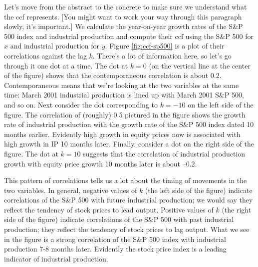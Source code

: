 \documentclass[letterpaper,12pt]{article}
\begin{document}
Let's move from the abstract to the concrete to make sure we 
understand what the ccf represents.
[You might want to work your way through this paragraph slowly, 
it's important.]  
We calculate the year-on-year growth rates of the S\&P 500 index 
and industrial production and compute their ccf using 
the S\&P 500 for $x$ and industrial production for $y$.
Figure \ref{fig:ccf-sp500} is a plot of their correlations against 
the lag $k$.
There's a lot of information here, so let's go through it 
one dot at a time.
The dot at $k=0$ (on the vertical line at the center of the figure) 
shows that the contemporaneous correlation is about 0.2.
Contemporaneous means that we're looking at the two variables
at the same time:  
March 2001 industrial production is lined up with March 2001 S\&P 500, 
and so on.  
Next consider the dot corresponding to $ k = -10$ on the left
side of the figure.
The correlation of (roughly) 0.5 pictured in the figure 
shows the growth rate of industrial production with 
the growth rate of the S\&P 500 index dated 
10 months earlier.  
Evidently high growth in equity prices now 
is associated with high growth in IP 10 months later.
Finally, consider a dot on the right side of the figure.
The dot at $k=10$ suggests that the correlation
of industrial production growth with equity price growth 10 months
later is about --0.2.  

This pattern of correlations tells us a lot about the 
timing of movements in the two variables.  
In general, negative values of $k$ (the left side of the figure) 
indicate correlations of the S\&P 500 with
future industrial production; we would say they reflect the tendency 
of stock prices to lead output.
Positive values of $k$ (the right side of the figure) 
indicate correlations of the S\&P 500 with
past industrial production; they reflect 
the tendency of stock prices to lag output.  
What we see in the figure is a strong correlation of the S\&P 500 index
with industrial production 7-8 months later.
Evidently the stock price index is a leading indicator of 
industrial production.  
\end{document}
